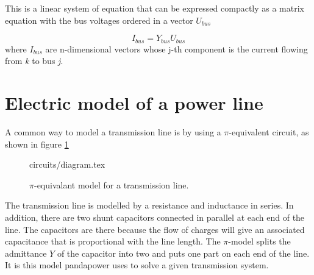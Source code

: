 \documentclass[class=book, crop=false]{standalone}
\begin{document}
This is a linear system of equation that can be expressed compactly as a matrix equation with the bus voltages ordered in a vector $U_{bus}$

\begin{equation}\label{eq:powerflow_busmatrix}
I_{bus} = Y_{bus}U_{bus}
\end{equation}
where $I_{bus}$ are n-dimensional vectors whose j-th component is the current flowing from \textit{k} to bus \textit{j}.


\section{Electric model of a power line}
A common way to model a transmission line is by using a $\pi$-equivalent circuit, as shown in figure \ref{fig:theory:PI_model}

\begin{figure}[ht!]
    {circuits/diagram.tex}
    \caption{$\pi$-equivalant model for a transmission line.}
    \label{fig:theory:PI_model}
\end{figure}



The transmission line is modelled by a resistance and inductance in series. In addition, there are two shunt capacitors connected in parallel at each end of the line. The capacitors are there because the flow of charges will give an associated capacitance that is proportional with the line length. The $\pi$-model splits the admittance $Y$ of the capacitor into two and puts one part on each end of the line. It is this model pandapower uses to solve a given transmission system. 
\end{document}
